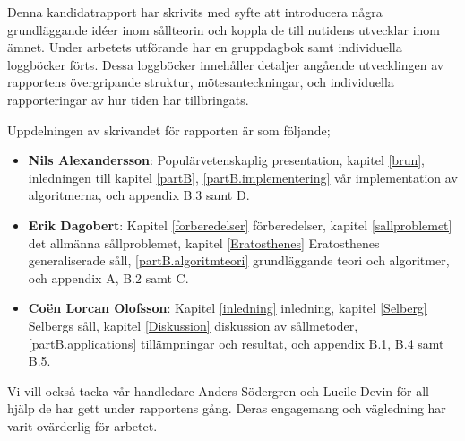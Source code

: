 Denna kandidatrapport har skrivits med syfte att introducera några grundläggande idéer inom sållteorin och koppla de till nutidens utvecklar inom ämnet.
Under arbetets utförande har en gruppdagbok samt individuella loggböcker förts.
Dessa loggböcker innehåller detaljer angående utvecklingen av rapportens övergripande struktur, mötesanteckningar, och individuella rapporteringar av hur tiden har tillbringats.

Uppdelningen av skrivandet för rapporten är som följande;
\begin{itemize}
    \item \textbf{Nils Alexandersson}: Populärvetenskaplig presentation, kapitel \ref{brun}, inledningen till kapitel \ref{partB}, \ref{partB.implementering} vår implementation av algoritmerna, och appendix B.3 samt D.
    \item \textbf{Erik Dagobert}: Kapitel \ref{forberedelser} förberedelser, kapitel \ref{sallproblemet} det allmänna sållproblemet, kapitel \ref{Eratosthenes} Eratosthenes generaliserade såll, \ref{partB.algoritmteori} grundläggande teori och algoritmer, och appendix A, B.2 samt C. 
    \item \textbf{Coën Lorcan Olofsson}: Kapitel \ref{inledning} inledning, kapitel \ref{Selberg} Selbergs såll, kapitel \ref{Diskussion} diskussion av sållmetoder, \ref{partB.applications} tillämpningar och resultat, och appendix B.1, B.4 samt B.5.
\end{itemize}
Vi vill också tacka vår handledare Anders Södergren och Lucile Devin för all hjälp de har gett under rapportens gång. 
Deras engagemang och vägledning har varit ovärderlig för arbetet.